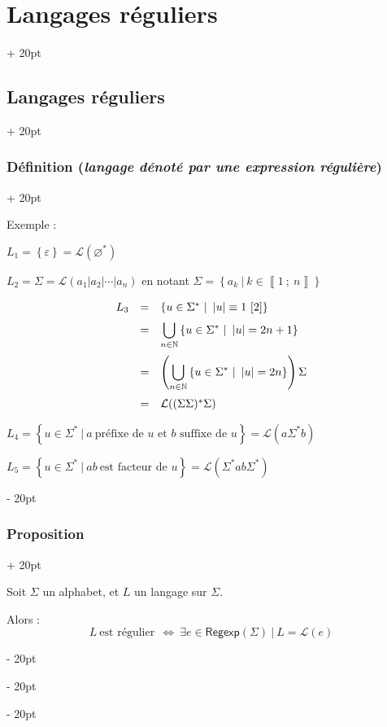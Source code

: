 \documentclass[a4paper, 12pt, twoside]{article}
\newcommand{\N}{\mathbb{N}} %
\newcommand{\nset}[2]{\left\llbracket #1\ ;\ #2 \right\rrbracket}
\newcommand{\lr}[1]{\left( #1 \right)}
\newcommand{\set}[1]{\left\{ #1 \right\}}
\newcommand{\abs}[1]{\left\lvert #1 \right\rvert}
\newcommand{\ssi}{\ \Leftrightarrow \ }
\newcommand{\ind}[1][20pt]{\advance\leftskip + #1}
\newcommand{\deind}[1][20pt]{\advance\leftskip - #1}
\newenvironment{indt}[2][20pt]{#2 \par \ind[#1]}{\par \deind} %
\newcommand{\Regexp}{\mathsf{Regexp}}
\begin{document}
\begin{indt}{\section{Langages réguliers}}
\begin{indt}{\subsection{Langages réguliers}}
\begin{indt}{\subsubsection{Définition (\textit{langage dénoté par une expression régulière})}}
                \vspace{6pt}
                
                Exemple :

                $L_1 = \set \varepsilon = \mathcal L(\varnothing^*)$

                $L_2 = \Sigma = \mathcal L(a_1 | a_2 | \cdots | a_n)$ en notant $\Sigma = \set{a_k\ |\ k \in \nset 1 n}$

                \[
                    \begin{array}{rcl}
                        L_3 &=& \set{u \in \Sigma^*\ |\ \abs u \equiv 1\ [2]}
                            \vspace{6pt}
                        \\
                            &=& \displaystyle \bigcup_{n \in \N} \set{u \in \Sigma^*\ |\ \abs u = 2n + 1}
                            \vspace{6pt}
                        \\
                            &=& \displaystyle \lr{\bigcup_{n \in \N} \set{u \in \Sigma^*\ |\ \abs u = 2n}}\Sigma
                            \vspace{6pt}
                        \\
                            &=& \mathcal L\!\lr{(\Sigma\Sigma)^* \Sigma}
                    \end{array}
                \]

                $L_4 = \set{u \in \Sigma^*\ |\ a\ \text{préfixe de $u$ et $b$ suffixe de $u$}} = \mathcal L(a\Sigma^* b)$

                $L_5 = \set{u \in \Sigma^*\ |\ ab\ \text{est facteur de $u$}} = \mathcal L(\Sigma^* ab \Sigma^*)$
            \end{indt}

            \vspace{12pt}
            
            \begin{indt}{\subsubsection{Proposition}}
                \begin{emphBox}
                    Soit $\Sigma$ un alphabet, et $L$ un langage sur $\Sigma$.

                    Alors :
                    \[
                        L\ \text{est régulier}\ \ssi \exists e \in \Regexp(\Sigma)\ |\ L = \mathcal L(e)
                    \]
                \end{emphBox}


\end{indt}
\end{indt}
\end{indt}
\end{document}
